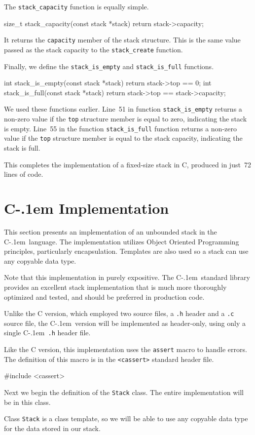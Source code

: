 \documentclass{article}
\newcommand{\Cpp}{\mbox{C\kern-.1em\raisebox{.35ex}{\smaller{\smaller{+\kern-0.05em+}}}}}
\begin{document}
  The \verb|stack_capacity| function is equally simple.
  \begin{lstc}
size_t stack_capacity(const stack *stack)
{
  return stack->capacity;
}\end{lstc}
  It returns the \verb|capacity| member of the stack structure. This is the same value passed as the stack capacity to the \verb|stack_create| function.

  Finally, we define the \verb|stack_is_empty| and \verb|stack_is_full| functions.
  \begin{lstc}
int stack_is_empty(const stack *stack)
{
  return stack->top == 0;
}
int stack_is_full(const stack *stack)
{
  return stack->top == stack->capacity;
}\end{lstc}
  We used these functions earlier. Line~51 in function \verb|stack_is_empty| returns a non-zero value if the \verb|top| structure member is equal to zero, indicating the stack is empty. Line~55 in the function \verb|stack_is_full| function returns a non-zero value if the \verb|top| structure member is equal to the stack capacity, indicating the stack is full.

  This completes the implementation of a fixed-size stack in C, produced in just~72 lines of code.

  \section{\texorpdfstring{\Cpp}{C++} Implementation}
  \label{sect:Cpp_implementation}
  This section presents an implementation of an unbounded stack in the \Cpp\ language. The implementation utilizes Object Oriented Programming principles, particularly encapsulation. Templates are also used so a stack can use any copyable data type.

  Note that this implementation in purely expositive. The \Cpp\ standard library provides an excellent stack implementation that is much more thoroughly optimized and tested, and should be preferred in production code.

  Unlike the C version, which employed two source files, a \verb|.h| header and a \verb|.c| source file, the \Cpp\ version will be implemented as header-only, using only a single \Cpp\ \verb|.h| header file.

  Like the C version, this implementation uses the \verb|assert| macro to handle errors. The definition of this macro is in the \verb|<cassert>| standard header file.
\begin{lstcpp}[firstnumber=1]
#include <cassert>\end{lstcpp}
  Next we begin the definition of the \verb|Stack| class. The entire implementation will be in this class.
\begin{lstcpp}
template <typename T>
class Stack
{\end{lstcpp}
  Class \verb|Stack| is a class template, so we will be able to use any copyable data type for the data stored in our stack.
\end{document}
